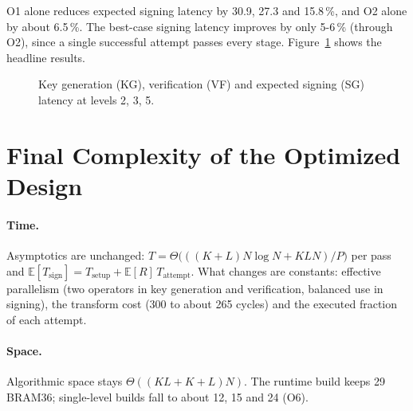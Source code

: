 \documentclass[12pt,a4paper]{report}
\begin{document}
O1 alone reduces expected signing latency by 30.9, 27.3 and 15.8\,\%, and O2 alone by about 6.5\,\%. The best-case signing latency improves by only 5-6\,\% (through O2), since a single successful attempt passes every stage. Figure~\ref{fig:bars} shows the headline results.

\begin{figure}[H]
\centering
{}
\caption{Key generation (KG), verification (VF) and expected signing (SG) latency at levels 2, 3, 5.}\label{fig:bars}
\end{figure}

\section{Final Complexity of the Optimized Design}\label{sec:final}
\paragraph{Time.}
Asymptotics are unchanged: $T=\Theta\big(((K{+}L)N\log N+KLN)/P\big)$ per pass and $\mathbb{E}[T_{\text{sign}}]=T_{\text{setup}}+\mathbb{E}[R]\,T_{\text{attempt}}$. What changes are constants: effective parallelism (two operators in key generation and verification, balanced use in signing), the transform cost (300 to about 265 cycles) and the executed fraction of each attempt.

\paragraph{Space.}
Algorithmic space stays $\Theta((KL+K+L)N)$. The runtime build keeps 29 BRAM36; single-level builds fall to about 12, 15 and 24 (O6).
\end{document}
